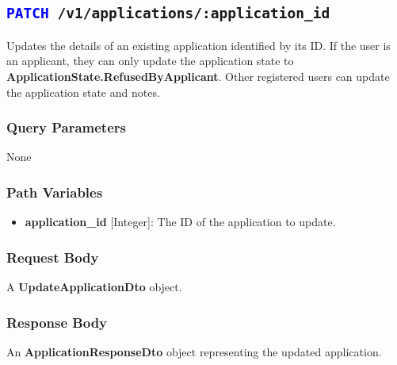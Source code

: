 
\subsection{\texttt{\textcolor{blue}{PATCH} /v1/applications/:application\_id}}

Updates the details of an existing application identified by its ID. 
If the user is an applicant, they can only update the application state to \textbf{ApplicationState.RefusedByApplicant}.
Other registered users can update the application state and notes.

\subsubsection{Query Parameters}
None

\subsubsection{Path Variables}
\begin{itemize}
    \item \textbf{application\_id} [Integer]: The ID of the application to update.
\end{itemize}

\subsubsection{Request Body}
A \textbf{UpdateApplicationDto} object.

\subsubsection{Response Body}
An \textbf{ApplicationResponseDto} object representing the updated application.
